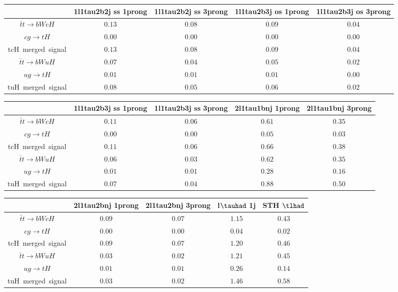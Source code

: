 \begin{tabular}{|c|c|c|c|c|} \hline
 & 1l1tau2b2j ss 1prong   & 1l1tau2b2j ss 3prong   & 1l1tau2b3j os 1prong   & 1l1tau2b3j os 3prong  \\\hline
$\bar{t}t\to bWcH$ & $0.13$ & $0.08$ & $0.09$ & $0.04$\\\hline
$cg\to tH$ & $0.00$ & $0.00$ & $0.00$ & $0.00$\\\hline
tcH~merged~signal & $0.13$ & $0.08$ & $0.09$ & $0.04$\\\hline
$\bar{t}t\to bWuH$ & $0.07$ & $0.04$ & $0.05$ & $0.02$\\\hline
$ug\to tH$ & $0.01$ & $0.01$ & $0.01$ & $0.00$\\\hline
tuH~merged~signal & $0.08$ & $0.05$ & $0.06$ & $0.02$\\\hline
\end{tabular}
\begin{tabular}{|c|c|c|c|c|} \hline
 & 1l1tau2b3j ss 1prong   & 1l1tau2b3j ss 3prong   & 2l1tau1bnj 1prong   & 2l1tau1bnj 3prong  \\\hline
$\bar{t}t\to bWcH$ & $0.11$ & $0.06$ & $0.61$ & $0.35$\\\hline
$cg\to tH$ & $0.00$ & $0.00$ & $0.05$ & $0.03$\\\hline
tcH~merged~signal & $0.11$ & $0.06$ & $0.66$ & $0.38$\\\hline
$\bar{t}t\to bWuH$ & $0.06$ & $0.03$ & $0.62$ & $0.35$\\\hline
$ug\to tH$ & $0.01$ & $0.01$ & $0.28$ & $0.16$\\\hline
tuH~merged~signal & $0.07$ & $0.04$ & $0.88$ & $0.50$\\\hline
\end{tabular}
\begin{tabular}{|c|c|c|c|c|} \hline
 & 2l1tau2bnj 1prong   & 2l1tau2bnj 3prong   & l$\tauhad$ 1j   & STH $\tlhad$   \\\hline
$\bar{t}t\to bWcH$ & $0.09$ & $0.07$ & $1.15$ & $0.43$\\\hline
$cg\to tH$ & $0.00$ & $0.00$ & $0.04$ & $0.02$\\\hline
tcH~merged~signal & $0.09$ & $0.07$ & $1.20$ & $0.46$\\\hline
$\bar{t}t\to bWuH$ & $0.03$ & $0.02$ & $1.21$ & $0.45$\\\hline
$ug\to tH$ & $0.01$ & $0.01$ & $0.26$ & $0.14$\\\hline
tuH~merged~signal & $0.03$ & $0.02$ & $1.46$ & $0.58$\\\hline
\end{tabular}
